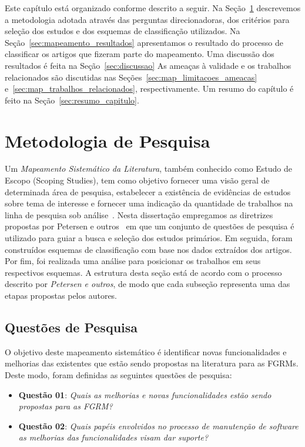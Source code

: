 Este capítulo está organizado conforme descrito a seguir. Na
Seção~\ref{sec:map-metodologia} descrevemos a metodologia adotada através das
perguntas direcionadoras, dos critérios para seleção dos estudos e dos esquemas
de classificação utilizados. Na Seção~\ref{sec:mapeamento_resultados}
apresentamos o resultado do processo de classificar os artigos que fizeram parte
do mapeamento. Uma discussão dos resultados é feita na Seção~\ref{sec:discussao}
As ameaças à validade e os trabalhos relacionados são discutidas nas
Seções~\ref{sec:map_limitacoes_ameacas} e~\ref{sec:map_trabalhos_relacionados},
respectivamente. Um resumo do capítulo é feito na
Seção~\ref{sec:resumo_capitulo}.

\section{Metodologia de Pesquisa}
\label{sec:map-metodologia}

Um \textit{Mapeamento Sistemático da Literatura}, também conhecido como Estudo
de Escopo (Scoping Studies), tem como objetivo fornecer uma visão geral de
determinada área de pesquisa, estabelecer a existência de evidências de estudos
sobre tema de interesse e fornecer uma indicação da quantidade de trabalhos na
linha de pesquisa sob
análise~\cite{keele2007guidelines,wohlin2012experimentation}.  Nesta dissertação
empregamos as diretrizes propostas por Petersen e outros~\cite{Petersen2008} em
que um conjunto de questões de pesquisa é utilizado para guiar a busca e seleção
dos estudos primários. Em seguida, foram construídos esquemas de classificação
com base nos dados extraídos dos artigos. Por fim, foi realizada uma análise
para posicionar os trabalhos em seus respectivos esquemas. A estrutura desta
seção está de acordo com o processo descrito por \textit{Petersen e outros}, de
modo que cada subseção representa uma das etapas propostas pelos autores.

\subsection{Questões de Pesquisa}
\label{subsec:map-questoes-de-pesquisa}

O objetivo deste mapeamento sistemático é identificar novas funcionalidades e
melhorias das existentes que estão sendo propostas na literatura para as FGRMs.
Deste modo, foram definidas as seguintes questões de pesquisa:

\begin{itemize}
	\item \textbf{Questão 01}: \textit{Quais as melhorias e novas
			funcionalidades estão sendo propostas para as FGRM?}
	\item \textbf{Questão 02}: \textit{Quais papéis envolvidos no processo de
			manutenção de software as melhorias das funcionalidades visam dar
			suporte?}
\end{itemize}

